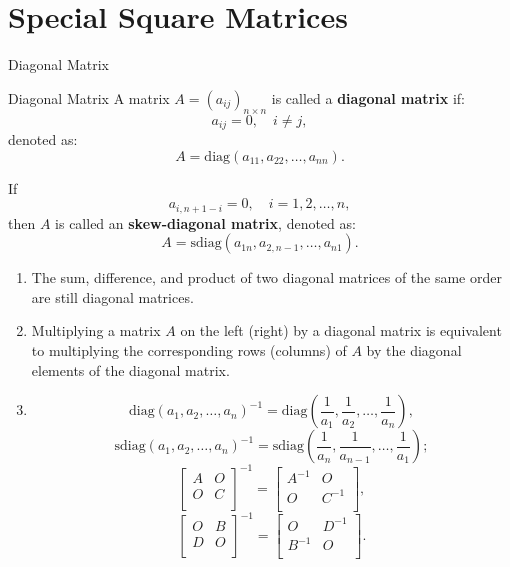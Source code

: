 \documentclass[11pt]{../../TexTemplate/elegantbook} %
\begin{document}
\section{Special Square Matrices}
\begin{leftbarTitle}{Diagonal Matrix}\end{leftbarTitle}
\begin{definition}{Diagonal Matrix}
    A matrix \( A = (a_{ij})_{n \times n} \) is called a \textbf{diagonal matrix} if:
    \[
    a_{ij} = 0, \quad i \neq j,
    \]
    denoted as:
    \[
    A = \mathrm{diag}(a_{11}, a_{22}, \dots, a_{nn}).
    \]

    If 
    \[
    a_{i,n+1-i} = 0, \quad i = 1, 2, \dots, n,
    \]
    then \( A \) is called an \textbf{skew-diagonal matrix},
    denoted as:
    \[
    A = \mathrm{sdiag}(a_{1n}, a_{2,n-1}, \dots, a_{n1}).
    \]
\end{definition}

\begin{property}
    \begin{enumerate}
        \item The sum, difference, and product of two diagonal matrices of the same order are still diagonal matrices.
        \item Multiplying a matrix \(A\) on the left (right) by a diagonal matrix is equivalent to 
            multiplying the corresponding rows (columns) of \(A\) by the diagonal elements of the diagonal matrix.
        \item 
            \[
            \mathrm{diag}(a_{1}, a_{2}, \dots, a_{n})^{-1} = 
            \mathrm{diag}\left( \frac{1}{a_{1}}, \frac{1}{a_{2}}, \dots, \frac{1}{a_{n}} \right),
            \] 
            \[
            \mathrm{sdiag}(a_{1}, a_{2}, \dots, a_{n})^{-1} = 
            \mathrm{sdiag}\left( \frac{1}{a_{n}}, \frac{1}{a_{n-1}}, \dots, \frac{1}{a_{1}} \right);
            \]
            \[
            \begin{bmatrix} A & O \\ O & C \\\end{bmatrix}^{-1} =
            \begin{bmatrix} A^{-1} & O \\ O & C^{-1} \\\end{bmatrix},
            \]
            \[
            \begin{bmatrix} O & B \\ D & O \\\end{bmatrix}^{-1} =
            \begin{bmatrix} O & D^{-1} \\ B^{-1} & O \\\end{bmatrix}.
            \]
    \end{enumerate} 
\end{property}
\end{document}
